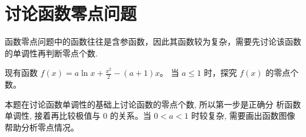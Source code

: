 


\section{讨论函数零点问题}

函数零点问题中的函数往往是含参函数，因此其函数较为复杂，需要先讨论该函数的单调性再判断零点个数.


\begin{example}
  现有函数 $f(x)=a \ln x+\frac{x^{2}}{2}-(a+1) x$。 当 $a \leq 1$ 时，探究 $f(x)$ 的零点个数。
\end{example}

\begin{analysis}
  本题在讨论函数单调性的基础上讨论函数的零点个数, 所以第一步是正确分 析函数单调性, 接着再比较极值与 0 的关系。当 $0<{a}<1$ 时较复杂, 需要画出函数图像 帮助分析零点情况。
\end{analysis}


